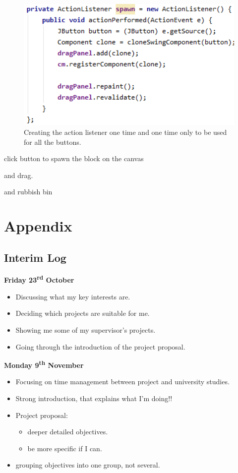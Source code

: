 \documentclass[a4paper, 12pt]{article}
\begin{document}
    \begin{figure}[h]
        \centering
        \includegraphics[width=120mm]{actionlistener.png}
        \caption{Creating the action listener one time and one time only to be used for all
        the buttons.}
    \end{figure}


    click button to spawn the block on the canvas

    and drag.

    and rubbish bin


    \clearpage
    \section{Appendix}
        \subsection{Interim Log}
            \textbf{Friday 23\textsuperscript{rd} October}
                \begin{itemize}
                    \item Discussing what my key interests are.
                    \item Deciding which projects are suitable for me.
                    \item Showing me some of my supervisor's projects. 
                    \item Going through the introduction of the project proposal. \\
                \end{itemize}
            \textbf{Monday 9\textsuperscript{th} November} 
                \begin{itemize}
                    \item Focusing on time management between project and university
                    studies.
                    \item Strong introduction, that explains what I'm doing!!
                    \item Project proposal:
                    \begin{itemize}
                        \item deeper detailed objectives.
                        \item be more specific if I can.
                    \end{itemize}
                    \item grouping objectives into one group, not several.
                \end{itemize}
\end{document}
